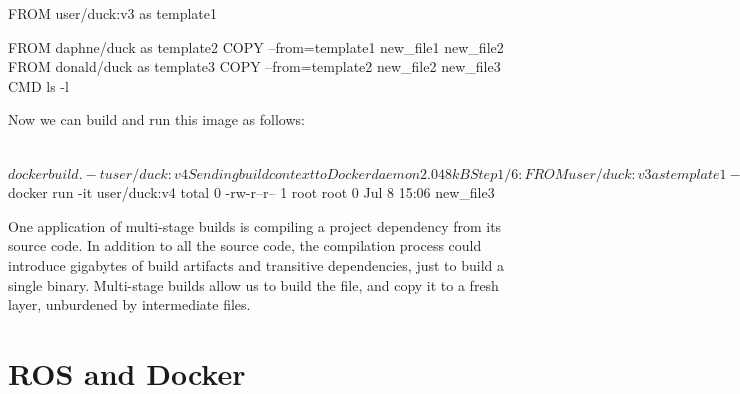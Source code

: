 \documentclass[12pt,initial,twoside,maitrise]{dms}
\numberwithin{equation}{section}
\numberwithin{table}{chapter}
\numberwithin{figure}{chapter}
\begin{document}
\begin{dockerlisting}
FROM user/duck:v3 as template1

FROM daphne/duck as template2
COPY --from=template1 new_file1 new_file2
FROM donald/duck as template3
COPY --from=template2 new_file2 new_file3
CMD ls -l
\end{dockerlisting}
%
Now we can build and run this image as follows:

\begin{pclisting}
~$ docker build . -t user/duck:v4
Sending build context to Docker daemon  2.048kB
Step 1/6 : FROM user/duck:v3 as template1
--- e3b75ef8ecc4
Step 2/6 : FROM daphne/duck as template2
--- ea2f90g8de9e
Step 3/6 : COPY --from=template1 new_file1 new_file2
---> 72b96668378e
Step 4/6 : FROM donald/duck:v3 as template3
---> e3b75ef8ecc4
Step 5/6 : COPY --from=template2 new_file2 new_file3
---> cb1b84277228
Step 6/6 : CMD ls
---> Running in cb1b84277228
Removing intermediate container cb1b84277228
---> c7dc5dd63e77
Successfully built c7dc5dd63e77
Successfully tagged user/duck:v4
~$ docker run -it user/duck:v4
total 0
-rw-r--r-- 1 root root 0 Jul  8 15:06 new_file3
\end{pclisting}
%
One application of multi-stage builds is compiling a project dependency from its source code. In addition to all the source code, the compilation process could introduce gigabytes of build artifacts and transitive dependencies, just to build a single binary. Multi-stage builds allow us to build the file, and copy it to a fresh layer, unburdened by intermediate files.

\section{ROS and Docker}\label{sec:ros-docker}
\end{document}
